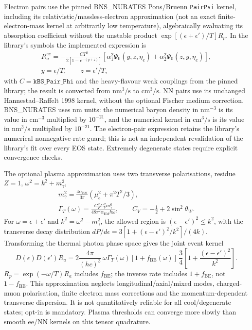 \documentclass[11pt,a4paper]{article}
\newcommand{\code}[1]{\texttt{#1}}
\begin{document}
Electron pairs use the pinned BNS\_NURATES Pons/Bruenn \code{PairPsi}
kernel, including its relativistic/massless-electron approximation (not an
exact finite-electron-mass kernel at arbitrarily low temperature),
algebraically evaluating its absorption coefficient without the unstable
product $\exp[(\epsilon+\epsilon')/T]R_p$. In the library's symbols the
implemented expression is
\[
 \begin{gathered}
 R_a^{ee}=-\frac{CT^2}{2[1-e^{-(y+z)}]}
 \left[\alpha_1^2\Psi_0(y,z,\eta_e)+
       \alpha_2^2\Psi_0(z,y,\eta_e)\right],\\
 y=\epsilon/T,\qquad z=\epsilon'/T,
 \end{gathered}
\]
with $C=\code{kBS\_Pair\_Phi}$ and the heavy-flavour weak couplings from
the pinned library; the result is converted from $\mathrm{nm^3/s}$ to
$\mathrm{cm^3/s}$. NN pairs use its unchanged Hannestad--Raffelt 1998 kernel,
without the optional Fischer medium correction. BNS\_NURATES uses nm units:
the numerical baryon density in $\mathrm{nm^{-3}}$ is its value in
$\mathrm{cm^{-3}}$ multiplied by $10^{-21}$, and the numerical kernel in
$\mathrm{cm^3/s}$ is its value in $\mathrm{nm^3/s}$ multiplied by $10^{-21}$.
The electron-pair expression retains the library's numerical
nonnegative-rate guard; this is not an independent revalidation of the
library's fit over every EOS state. Extremely degenerate states require
explicit convergence checks.

The optional plasma approximation uses two transverse polarisations, residue
$Z=1$, $\omega^2=k^2+m_\gamma^2$,
\begin{equation}\label{eq:plasmon-mass}
 \begin{gathered}
 m_\gamma^2=\frac{4\alpha_{\mathrm{EM}}}{3\pi}
 \left(\mu_e^2+\pi^2T^2/3\right),\\
 \Gamma_T(\omega)=\frac{G_F^2C_V^2m_\gamma^6}
 {48\pi^2\alpha_{\mathrm{EM}}\hbar\omega},\qquad
 C_V=-\tfrac12+2\sin^2\theta_W.
 \end{gathered}
\end{equation}
For $\omega=\epsilon+\epsilon'$ and $k^2=\omega^2-m_\gamma^2$, the allowed
region is $(\epsilon-\epsilon')^2\leq k^2$, with the transverse decay
distribution $dP/d\epsilon=3[1+(\epsilon-\epsilon')^2/k^2]/(4k)$.
Transforming the thermal photon phase space gives the joint event kernel
\begin{equation}\label{eq:plasmon-kernel}
 D(\epsilon)D(\epsilon')R_a=
 2\frac{4\pi}{(hc)^3}\,\omega\Gamma_T(\omega)
 [1+f_{\mathrm{BE}}(\omega)]\,\frac34
 \left[1+\frac{(\epsilon-\epsilon')^2}{k^2}\right].
\end{equation}
$R_p=\exp(-\omega/T)R_a$ includes $f_{\mathrm{BE}}$; the inverse rate
includes $1+f_{\mathrm{BE}}$, not $1-f_{\mathrm{BE}}$. This approximation
neglects longitudinal/axial/mixed modes, charged-muon polarisation, finite
electron mass corrections and the momentum-dependent transverse dispersion.
It is not quantitatively reliable for all cool/degenerate states; opt-in is
mandatory. Plasma thresholds can converge more slowly than smooth ee/NN
kernels on this tensor quadrature.
\end{document}
